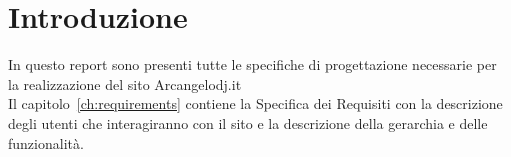 \chapter{Introduzione}

In questo report sono presenti tutte le specifiche di progettazione necessarie per la realizzazione del sito Arcangelodj.it\\
Il capitolo~\ref{ch:requirements} contiene la Specifica dei Requisiti con la descrizione degli utenti che interagiranno con il sito e la descrizione della gerarchia e delle funzionalità.\\
